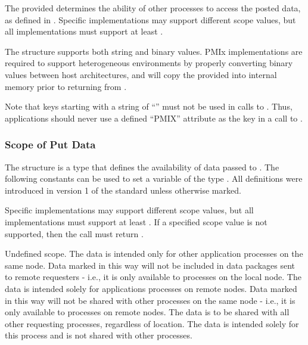 The provided  determines the ability of other processes to access the posted data, as defined in .
Specific implementations may support different scope values, but all implementations must support at least .

The  structure supports both string and binary values.
\ac{PMIx} implementations are required to support heterogeneous environments by properly converting binary values between host architectures, and will copy the provided  into internal memory prior to returning from .

\adviceuserstart
Note that keys starting with a string of ``'' must not be used in calls to . Thus, applications should never use a defined ``PMIX'' attribute as the key in a call to .
\adviceuserend


\subsubsection{Scope of Put Data}
\label{api:nres:scope}

The  structure is a  type that defines the availability of data passed to .
The following constants can be used to set a variable of the type . All definitions were introduced in version 1 of the standard unless otherwise marked.

Specific implementations may support different scope values, but all implementations must support at least .
If a specified scope value is not supported, then the  call must return .

\begin{constantdesc}
%
Undefined scope.
%
The data is intended only for other application processes on the same node.
Data marked in this way will not be included in data packages sent to remote requesters - i.e., it is only available to processes on the local node.
%
The data is intended solely for applications processes on remote nodes.
Data marked in this way will not be shared with other processes on the same node - i.e., it is only available to  processes on remote nodes.
%
The data is to be shared with all other requesting processes, regardless of location.
%
The data is intended solely for this process and is not shared with other processes.
%
\end{constantdesc}


